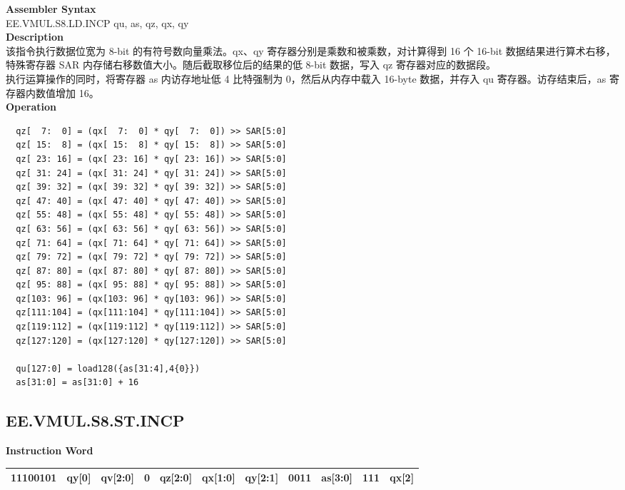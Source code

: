 \textbf{Assembler Syntax} \\
EE.VMUL.S8.LD.INCP qu, as, qz, qx, qy \\
\textbf{Description} \\
该指令执行数据位宽为 8-bit 的有符号数向量乘法。qx、qy 寄存器分别是乘数和被乘数，对计算得到 16 个 16-bit 数据结果进行算术右移，特殊寄存器 SAR 内存储右移数值大小。随后截取移位后的结果的低 8-bit 数据，写入 qz 寄存器对应的数据段。\\ 执行运算操作的同时，将寄存器 as 内访存地址低 4 比特强制为 0，然后从内存中载入 16-byte 数据，并存入 qu 寄存器。访存结束后，as 寄存器内数值增加 16。\\
\textbf{Operation}
\begin{lstlisting}
  qz[  7:  0] = (qx[  7:  0] * qy[  7:  0]) >> SAR[5:0]
  qz[ 15:  8] = (qx[ 15:  8] * qy[ 15:  8]) >> SAR[5:0]
  qz[ 23: 16] = (qx[ 23: 16] * qy[ 23: 16]) >> SAR[5:0]
  qz[ 31: 24] = (qx[ 31: 24] * qy[ 31: 24]) >> SAR[5:0]
  qz[ 39: 32] = (qx[ 39: 32] * qy[ 39: 32]) >> SAR[5:0]
  qz[ 47: 40] = (qx[ 47: 40] * qy[ 47: 40]) >> SAR[5:0]
  qz[ 55: 48] = (qx[ 55: 48] * qy[ 55: 48]) >> SAR[5:0]
  qz[ 63: 56] = (qx[ 63: 56] * qy[ 63: 56]) >> SAR[5:0]
  qz[ 71: 64] = (qx[ 71: 64] * qy[ 71: 64]) >> SAR[5:0]
  qz[ 79: 72] = (qx[ 79: 72] * qy[ 79: 72]) >> SAR[5:0]
  qz[ 87: 80] = (qx[ 87: 80] * qy[ 87: 80]) >> SAR[5:0]
  qz[ 95: 88] = (qx[ 95: 88] * qy[ 95: 88]) >> SAR[5:0]
  qz[103: 96] = (qx[103: 96] * qy[103: 96]) >> SAR[5:0]
  qz[111:104] = (qx[111:104] * qy[111:104]) >> SAR[5:0]
  qz[119:112] = (qx[119:112] * qy[119:112]) >> SAR[5:0]
  qz[127:120] = (qx[127:120] * qy[127:120]) >> SAR[5:0]

  qu[127:0] = load128({as[31:4],4{0}})
  as[31:0] = as[31:0] + 16
\end{lstlisting}

\clearpage
\subsection{EE.VMUL.S8.ST.INCP}\label{instruction:EEVMULS8STINCP}
\setlength\tabcolsep{6pt}
\textbf{Instruction Word} \\
\begin{tabular}{|c|c|c|c|c|c|c|c|c|c|c|}
	\hline
	11100101 & qy[0] & qv[2:0] & 0 & qz[2:0] & qx[1:0] & qy[2:1] & 0011 & as[3:0] & 111 & qx[2] \\
	\hline
\end{tabular}

